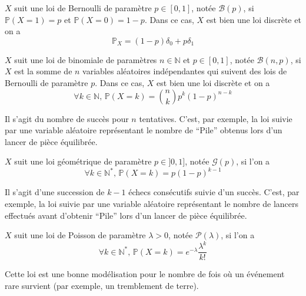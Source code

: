   \begin{example}
    $X$ suit une loi de Bernoulli de paramètre $p \in [0,1]$, notée $\mathcal{B}(p)$, si $\mathbb{P}(X=1) = p$ et $\mathbb{P}(X=0)=1-p$. Dans ce cas, $X$ est bien une loi discrète et on a
    \[ \mathbb{P}_X = (1-p) \delta_0 + p \delta_1 \]
  \end{example}

  \begin{example}
    $X$ suit une loi de binomiale de paramètres $n \in \mathbb{N}$ et $p \in [0,1]$, notée $\mathcal{B}(n, p)$, si $X$ est la somme de $n$ variables aléatoires indépendantes qui suivent des lois de Bernoulli de paramètre $p$. Dans ce cas, $X$ est bien une loi discrète et on a
    \[ \forall k \in \mathbb{N}, \, \mathbb{P}(X = k) = \binom{n}{k} p^k (1-p)^{n-k} \]
  \end{example}

  \begin{remark}
    Il s'agit du nombre de succès pour $n$ tentatives.
    \newpar
    C'est, par exemple, la loi suivie par une variable aléatoire représentant le nombre de ``Pile'' obtenus lors d'un lancer de pièce équilibrée.
  \end{remark}

  \begin{example}
    $X$ suit une loi géométrique de paramètre $p \in ]0,1]$, notée $\mathcal{G}(p)$, si l'on a
    \[ \forall k \in \mathbb{N}^{*}, \, \mathbb{P}(X = k) = p(1-p)^{k-1} \]
  \end{example}

  \begin{remark}
    Il s'agit d'une succession de $k-1$ échecs consécutifs suivie d'un succès.
    \newpar
    C'est, par exemple, la loi suivie par une variable aléatoire représentant le nombre de lancers effectués avant d'obtenir ``Pile'' lors d'un lancer de pièce équilibrée.
  \end{remark}

  \begin{example}
    $X$ suit une loi de Poisson de paramètre $\lambda > 0$, notée $\mathcal{P}(\lambda)$, si l'on a
    \[ \forall k \in \mathbb{N}^{*}, \, \mathbb{P}(X = k) = e^{-\lambda} \frac{\lambda^k}{k!} \]
  \end{example}


  \begin{remark}
    Cette loi est une bonne modélisation pour le nombre de fois où un événement rare survient (par exemple, un tremblement de terre).
  \end{remark}

